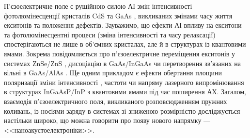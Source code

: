 П'єзоелектричне поле є  рушійною силою АІ змін інтенсивності фотолюмінесценції кристалів CdS \cite{KOROTCHENKOV1998,KorotchenAPL1998} та GaAs \cite{Zhuravlev}, викликаних змінами часу життя екситонів та положення дефектів.
Зауважимо, що ефекти АІ впливу на екситони та фотолюмінесцентні процеси (зміна інтенсивності та часу релаксації) спостерігаються не лише в об'ємних кристалах, але й в структурах із квантовими ямами.
Зокрема повідомляється про п'єзоелектричне переміщення екситонів у системах ZnSe/ZnS \cite{KorotAPL1999,Ostrovskii2001},
дисоціацію в GaAs/InGaAs \cite{PhysRevLett78} чи перетворення зв'язаних на вільні в GaAs/AlAs \cite{PhysRevB80:165307}.
Ще одним прикладом є ефекти
обертання площини поляризації \cite{Kulakova:2012SSC,KulakFTP2013}
зміни інтенсивності \cite{Kulakova:09,KulacFTT2009,KulakJETF2007}, частоти \cite{KulakPJETF} чи напряму \cite{KulakPJTF2010} лазерного випромінювання в структурах InGaAsP/InP з квантовими ямами під час поширення АХ.
Загалом, взаємодія п'єзоелектричного поля, викликаного розповсюдженням  пружних коливань, із носіями заряду в системах зі зниженою розмірністю досліджується настільки широко, що можна говорити про появу нового напрямку --- <<наноакустоелектроніки>>.





